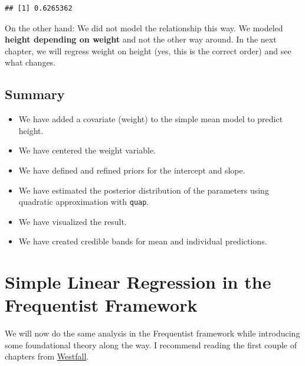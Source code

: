 \documentclass[
]{book}
\newenvironment{Shaded}{\begin{snugshade}}{\end{snugshade}}
\newcommand{\DecValTok}[1]{\textcolor[rgb]{0.00,0.00,0.81}{#1}}
\newcommand{\FunctionTok}[1]{\textcolor[rgb]{0.13,0.29,0.53}{\textbf{#1}}}
\newcommand{\NormalTok}[1]{#1}
\newcommand{\SpecialCharTok}[1]{\textcolor[rgb]{0.81,0.36,0.00}{\textbf{#1}}}
\providecommand{\tightlist}{%
  \setlength{\itemsep}{0pt}\setlength{\parskip}{0pt}}
\begin{document}
\begin{Shaded}
\end{Shaded}

\begin{verbatim}
## [1] 0.6265362
\end{verbatim}

On the other hand: We did not model the relationship this way.
We modeled \textbf{height depending on weight} and not the other way around.
In the next chapter, we will regress weight on height (yes, this is the correct order)
and see what changes.

\subsection{Summary}\label{summary}

\begin{itemize}
\tightlist
\item
  We have added a covariate (weight) to the simple mean model to predict height.
\item
  We have centered the weight variable.
\item
  We have defined and refined priors for the intercept and slope.
\item
  We have estimated the posterior distribution of the parameters using quadratic approximation with \texttt{quap}.
\item
  We have visualized the result.
\item
  We have created credible bands for mean and individual predictions.
\end{itemize}

\section{Simple Linear Regression in the Frequentist Framework}\label{simple-linear-regression-in-the-frequentist-framework}

We will now do the same analysis in the Frequentist framework while introducing
some foundational theory along the way.
I recommend reading the first couple of chapters from \href{https://www.routledge.com/Understanding-Regression-Analysis-A-Conditional-Distribution-Approach/Westfall-Arias/p/book/9780367493516?srsltid=AfmBOore3O_Ciecl0TTkr9AjPIY1d6OmbQa7o7IAdKpTSkD8s9HkwzD4}{Westfall}.
\end{document}
